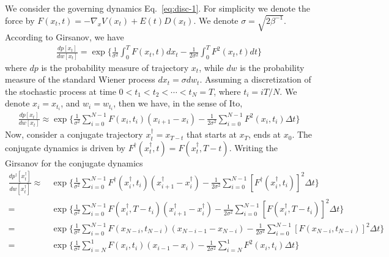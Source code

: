 \documentclass[journal=jctcce,manuscript=article]{achemso}
\newcommand{\dt}[0]{\Delta t}
\begin{document}
We consider the governing dynamics Eq.~\eqref{eq:disc-1}.
For simplicity we denote the force by $F(x_t,t) = -\nabla_x V(x_t)+ E(t)D(x_t) $.  We denote $\sigma =  \sqrt{2\beta^{-1}} $.
According to Girsanov, we have
\begin{align}
  \label{eq:tmp8}
  \frac{dp[x_t]}{dw[x_t]}  =
  \exp \bigg\{
  \frac 1{\sigma^2}\int_0^T F(x_t,t) dx_t -
  \frac1{2\sigma^2}\int_0^T F^2(x_t,t) dt
  \bigg\}
\end{align}
where $dp$ is the probability measure of trajectory $x_t$, while $dw$ is the
probability measure of the standard Wiener process $dx_t = \sigma dw_t$.
Assuming a discretization of the
stochastic process at time $0 < t_1 < t_2 < \cdots < t_N = T$, where
$t_i = iT / N$. We denote $x_i = x_{t_i}$, and $w_i = w_{t_i}$, then we have,
in the sense of Ito,
\begin{align}\label{eq:tmp9}
  \frac{dp[x_t]}{dw[x_t]}  \approx
  \exp\bigg\{\frac1{\sigma^2}\sum_{i=0}^{N-1} F(x_{i},t_{i})(x_{i+1} - x_i) -\frac1{2\sigma^2}\sum_{i=0}^{N-1}F^2(x_i,t_i)\dt\bigg\} 
\end{align}
Now, consider a conjugate trajectory $x^\dagger_t = x_{T-t}$ that starts at $x_T$, ends at $x_0$. The conjugate dynamics is driven by  $F^\dagger(x^\dagger_t,t) = F(x^\dagger_t, T-t)$.
Writing the Girsanov for the conjugate dynamics
\begin{align}\label{eq:dagger-0}
  \frac{dp^\dagger[x^\dagger_t]}{dw[x^\dagger_t]}  
  \approx\,&
  \exp\bigg\{
  \frac1{\sigma^2}\sum_{i=0}^{N-1} F^\dagger(x^\dagger_{i},t_{i})(x^\dagger_{i+1} - x^\dagger_i) -
  \frac1{2\sigma^2}\sum_{i=0}^{N-1}[F^\dagger(x^\dagger_i,t_i)]^2\dt\bigg\} \\ \nonumber
  =\,&
  \exp\bigg\{
  \frac1{\sigma^2}\sum_{i=0}^{N-1} F(x^\dagger_{i},T - t_{i})(x^\dagger_{i+1} - x^\dagger_i) -
  \frac1{2\sigma^2}\sum_{i=0}^{N-1}[F(x^\dagger_i, T-t_i)]^2\dt\bigg\} \\\nonumber
  =\,&
  \exp\bigg\{
  \frac1{\sigma^2}\sum_{i=0}^{N-1} F(x_{N-i},t_{N-i})(x_{N-i-1} - x_{N-i}) -
  \frac1{2\sigma^2}\sum_{i=0}^{N-1}[F(x_{N-i},t_{N-i})]^2\dt\bigg\} \\
  = \,&
  \exp\bigg\{
  \frac1{\sigma^2}\sum_{i=N}^{1} F(x_{i},t_{i})(x_{i-1} - x_i) -
  \frac1{2\sigma^2}\sum_{i=N}^{1}F^2(x_i,t_i)\dt\bigg\}
\end{align}
\end{document}
